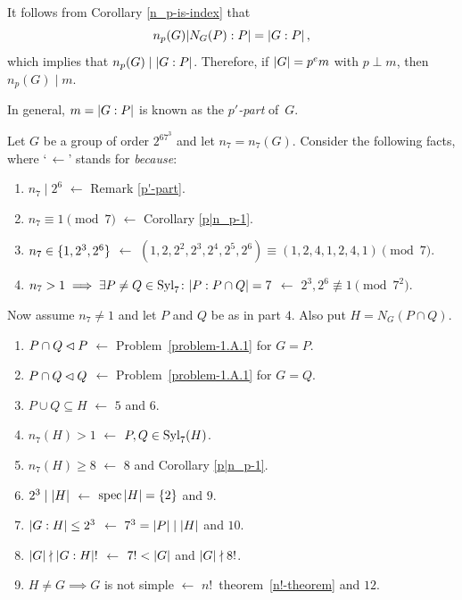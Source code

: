 \begin{rem}\label{p'-part}
    It follows from {\upshape Corollary \ref{n_p-is-index}} that
    $$
        n_p(G)|N_G(P):P|=\left\vert{G:P}\right\vert,
    $$
    which implies that $n_p(G)\mid\left\vert{G:P}\right\vert$. Therefore, if\/ $\left\vert{G}\right\vert=p^em$ with $p\perp m$, then $n_p(G)\mid m$.

    In general, $m=\left\vert{G:P}\right\vert$ is known as the \textsl{$p'$-part} of\/~$G$.
\end{rem}


\begin{xmpl}
    Let $G$ be a group of order $2^67^3$ and let $n_7=n_7(G)$. Consider the following facts, where `$\,\leftarrow$' stands for \emph{because}:
    \begin{enumerate}[$1$.]
        \item $n_7\mid2^6$ $\leftarrow$ {\upshape Remark \ref{p'-part}}.
        \item $n_7\equiv1\pmod7$ $\leftarrow$ {\upshape Corollary \ref{p|n_p-1}}.
        \item $n_7\in\{1, 2^3, 2^6\}$ $\leftarrow$ $(1, 2, 2^2, 2^3, 2^4, 2^5, 2^6)\equiv(1, 2, 4, 1, 2, 4, 1)\pmod7$.
        \item $n_7>1\implies\exists P\ne Q\in{\rm Syl}_7\colon |P:P\cap Q|=7$ $\leftarrow$ $2^3,2^6\not\equiv1\pmod{7^2}$.
    \end{enumerate}
        Now assume\/ $n_7\ne1$ and let\/ $P$ and\/ $Q$ be as in part $4$. Also put $H=N_G(P\cap Q)$.
    \begin{enumerate}
        \item[$5$.] $P\cap Q\lhd P$ $\leftarrow$ {\upshape Problem~\ref{problem-1.A.1} for $G=P$}.
        \item[$6$.] $P\cap Q\lhd Q$ $\leftarrow$ {\upshape Problem~\ref{problem-1.A.1} for $G=Q$}.
        \item[$7$.] $P\cup Q\subseteq H$ $\leftarrow$ {\upshape $5$ and $6$}.
        \item[$8$.] $n_7(H)>1$ $\leftarrow$ $P,Q\in{\rm Syl}_7(H)$.
        \item[$9$.] $n_7(H)\ge8$ $\leftarrow$ {\upshape $8$ and Corollary \ref{p|n_p-1}}.
        \item[$10$.] $2^3\mid\left\vert{H}\right\vert$ $\leftarrow$ {\upshape $\operatorname{spec}\left\vert{H}\right\vert=\{2\}$ and $9$}. 
        \item[$11$.] $\left\vert{G:H}\right\vert\le2^3$ $\leftarrow$ {\upshape $7^3=\left\vert{P}\right\vert\mid\left\vert{H}\right\vert$ and $10$}.
        \item[$12$.] $\left\vert{G}\right\vert\nmid\left\vert{G:H}\right\vert!$ $\leftarrow$ {\upshape $7!<\left\vert{G}\right\vert$ and $\left\vert{G}\right\vert\nmid8!$}.
        \item[$13$.] $H\ne G\implies G$ is not simple $\leftarrow$ {\upshape $n!$~theorem~\ref{n!-theorem} and $12$}.

\end{enumerate}
\end{xmpl}
